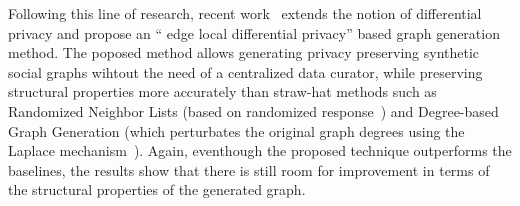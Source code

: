Following this line of research, recent work~\cite{qin2017generating} extends the notion of differential privacy
and propose an `` edge local differential privacy'' based graph generation
method. The poposed method allows generating privacy preserving synthetic social
graphs wihtout the need of a centralized data curator, while preserving structural
properties more accurately than straw-hat methods such as Randomized
Neighbor Lists (based on randomized response~\cite{dwork2014algorithmic}) and
Degree-based Graph Generation (which perturbates the original graph degrees
using the Laplace mechanism~\cite{dwork2009differential}). Again, eventhough the
proposed technique outperforms the baselines, the results show that there is
still room for improvement in terms of the structural properties of the
generated graph.
